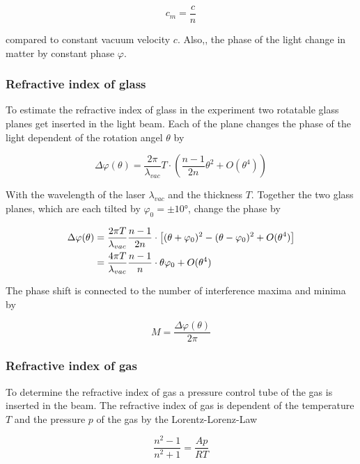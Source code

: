 \begin{equation}
    c_m=\frac{c}{n}
\end{equation}

compared to constant vacuum velocity $c$. 
Also,, the phase of the light change in matter by constant phase $\varphi $. 

\subsubsection{Refractive index of glass}
To estimate the refractive index of glass in the experiment two rotatable glass planes get inserted in the light beam. 
Each of the plane changes the phase of the light dependent of the rotation angel $\theta $ by

\begin{equation}
    \Delta \varphi(\theta ) =\frac{2\pi }{\lambda_{vac}}T \cdot \left(\frac{n-1}{2n}\theta ^2 +O(\theta ^4)  \right)
\end{equation}

With the wavelength of the laser $\lambda_{vac}$ and the thickness $T$.
Together the two glass planes, which are each tilted by $\varphi_0=\pm 10°$, change the phase by 

\begin{align}
    \Delta \varphi(\theta ) &=\frac{2\pi T}{\lambda_{vac}} \frac{n-1}{2n} \cdot \left[(\theta+\varphi_0)^2 - (\theta-\varphi_0)^2 +O(\theta ^4)  \right] \notag\\
                            &=\frac{4\pi T}{\lambda_{vac}} \frac{n-1}{n} \cdot \theta\varphi_0 +O(\theta ^4) 
\end{align}\label{eq:glass}

The phase shift is connected to the number of interference maxima and minima by 

\begin{equation}
    M=\frac{\Delta \varphi(\theta)}{2\pi}
\end{equation}

\subsubsection{Refractive index of gas}
To determine the refractive index of gas a pressure control tube of the gas is inserted in the beam.
The refractive index of gas is dependent of the temperature $T$ and the pressure $p$ of the gas by the Lorentz-Lorenz-Law

\begin{equation}
    \frac{n^2-1}{n^2+1}=\frac{Ap}{RT}
\end{equation}

